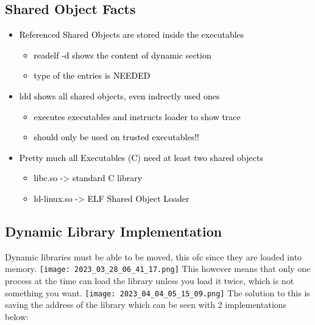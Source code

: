 \documentclass[main.tex,fontsize=8pt,paper=a4,paper=portrait,DIV=calc,]{scrartcl}
\begin{document}
\subsection{Shared Object Facts}
\begin{itemize}
\item \textcolor{black}{Referenced Shared Objects are stored inside the executables}\newline
  \begin{itemize}
  \item \textcolor{black}{readelf -d shows the content of dynamic section}
  \item \textcolor{black}{type of the entries is NEEDED}
  \end{itemize} 
\item \textcolor{black}{ldd shows all shared objects, even indrectly used ones}\newline
  \begin{itemize}
  \item \textcolor{black}{executes executables and instructs loader to show trace}
  \item \textcolor{black}{should only be used on trusted executables!!}
  \end{itemize} 
\item \textcolor{black}{Pretty much all Executables (C) need at least two shared objects}\newline
  \begin{itemize}
  \item \textcolor{black}{libc.so -> standard C library}
  \item \textcolor{black}{ld-linux.so -> ELF Shared Object Loader}
  \end{itemize} 
\end{itemize} 

\subsection{Dynamic Library Implementation}
Dynamic libraries must be able to be moved, this ofc since they are loaded into memory.\newline
\texttt{[image: 2023\_03\_28\_06\_41\_17.png]}\newline
This however means that only one process at the time can load the library unless you load it twice, which is not something you want.\newline
\texttt{[image: 2023\_04\_04\_05\_15\_09.png]}\newline
The solution to this is saving the address of the library which can be seen with 2 implementations below:
\end{document}
